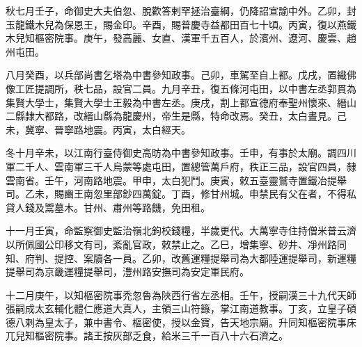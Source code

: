 \begin{pinyinscope}
 秋七月壬子，命御史大夫伯忽、脫歡答剌罕拯治臺綱，仍降詔宣諭中外。乙卯，封玉龍鐵木兒為保恩王，賜金印。辛酉，賜普慶寺益都田百七十頃。丙寅，復以燕鐵木兒知樞密院事。庚午，發高麗、女直、漢軍千五百人，於濱州、遼河、慶雲、趙州屯田。



 八月癸酉，以兵部尚書乞塔為中書參知政事。己卯，車駕至自上都。戊戌，置織佛像工匠提調所，秩七品，設官二員。九月辛丑，復五條河屯田，以中書左丞郭貫為集賢大學士，集賢大學士王毅為中書左丞。庚戌，割上都宣德府奉聖州懷來、縉山二縣隸大都路，改縉山縣為龍慶州，帝生是縣，特命改焉。癸丑，太白晝見。己未，冀寧、晉寧路地震。丙寅，太白經天。



 冬十月辛未，以江南行臺侍御史高昉為中書參知政事。壬申，有事於太廟。調四川軍二千人、雲南軍三千人烏蒙等處屯田，置總管萬戶府，秩正三品，設官四員，隸雲南省。壬午，河南路地震。甲申，太白犯鬥。庚寅，敕五臺靈鷲寺置鐵冶提舉司。乙未，賜豳王南忽里部鈔四萬錠。丁酉，修甘州城。申禁民有父在者，不得私貸人錢及鬻墓木。甘州、肅州等路饑，免田租。



 十一月壬寅，命監察御史監治嶺北鉤校錢糧，半歲更代。大萬寧寺住持僧米普云濟以所佩國公印移文有司，紊亂官政，敕禁止之。乙巳，增集寧、砂井、凈州路同知、府判、提控、案牘各一員。乙卯，改舊運糧提舉司為大都陸運提舉司，新運糧提舉司為京畿運糧提舉司，澧州路安撫司為安定軍民府。



 十二月庚午，以知樞密院事禿忽魯為陜西行省左丞相。壬午，授嗣漢三十九代天師張嗣成太玄輔化體仁應道大真人，主領三山符籙，掌江南道教事。丁亥，立皇子碩德八剌為皇太子，兼中書令、樞密使，授以金寶，告天地宗廟。升同知樞密院事床兀兒知樞密院事。諸王按灰部乏食，給米三千一百八十六石濟之。



\end{pinyinscope}